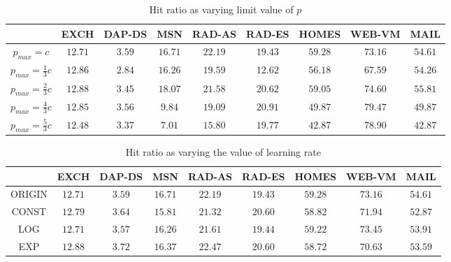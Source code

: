 \begin{table*}[th]
    \captionsetup{font=normalsize}
    \normalsize
    \centering
    
        \begin{tabular}{|c|c|c|c|c|c|c|c|c|}

\hline
 &\textbf{EXCH} & \textbf{DAP-DS} & \textbf{MSN} & \textbf{RAD-AS} & \textbf{RAD-ES} & \textbf{HOMES} & \textbf{WEB-VM} & \textbf{MAIL} \\
\hline
\cline 

$p_{max}=c$ &           $12.71$ & $3.59$ & $16.71$ & $22.19$ & $19.43$ & $59.28$ & $73.16$ & $54.61$   \\ [1ex]
\hline
$p_{max}=\frac{1}{3}c$ & $12.86$ & $2.84$ & $16.26$ & $19.59$ & $12.62$ & $ 56.18 $ & $67.59$ & $54.26$ \\ [1ex]
\hline
$p_{max}=\frac{2}{3}c$ & $12.88$ & $3.45$ & $18.07$ & $21.58$ & $20.62$ & $59.05$ & $74.60$ & $55.81$   \\ [1ex]
\hline
$p_{max}=\frac{4}{3}c$ & $12.85$ & $3.56$ & $9.84$ & $19.09$ & $20.91$ & $49.87$ & $79.47$ & $49.87$   \\ [1ex]
\hline
$p_{max}=\frac{5}{3}c$ & $12.48$ & $3.37$ & $7.01$ & $15.80$ & $19.77$ & $42.87$ & $78.90$ & $42.87$   \\ [1ex]
\hline

        \end{tabular}
\caption{Hit ratio as varying limit value of $p$}
\end{table*}






\begin{table*}[th]
    \captionsetup{font=normalsize}
    \normalsize
    \centering
    
        \begin{tabular}{|c|c|c|c|c|c|c|c|c|}

\hline
 &\textbf{EXCH} & \textbf{DAP-DS} & \textbf{MSN} & \textbf{RAD-AS} & \textbf{RAD-ES} & \textbf{HOMES} & \textbf{WEB-VM} & \textbf{MAIL} \\
\hline
\cline 

ORIGIN & $12.71$ & $3.59$ & $16.71$ & $22.19$ & $19.43$ & $59.28$ & $73.16$ & $54.61$   \\ 
\hline
CONST & $12.79$ & $3.64$ & $15.81$ & $21.32$ & $20.60$ & $ 58.82 $ & $ 71.94 $ & $ 52.87 $ \\ 
\hline
LOG &   $12.71$ & $ 3.57 $ & $ 16.26 $ & $ 21.61 $ & $19.44$ & $ 59.22 $ & $ 73.45 $ & $53.91$   \\
\hline
EXP &   $12.88$ & $ 3.72 $ & $ 16.37 $ & $ 22.47 $ & $ 20.60$ & $ 58.72 $ & $ 70.63 $ & $ 53.59 $   \\ 
\hline


        \end{tabular}
\caption{Hit ratio as varying the value of learning rate \delta}
\end{table*}




